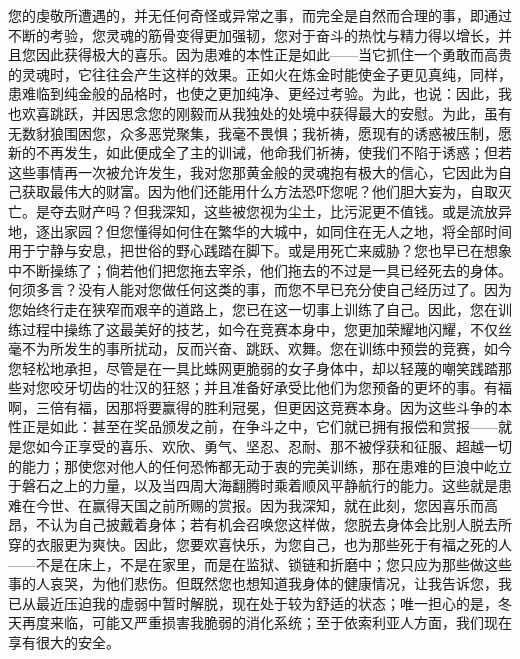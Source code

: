 您的虔敬所遭遇的，并无任何奇怪或异常之事，而完全是自然而合理的事，即通过不断的考验，您灵魂的筋骨变得更加强韧，您对于奋斗的热忱与精力得以增长，并且您因此获得极大的喜乐。因为患难的本性正是如此——当它抓住一个勇敢而高贵的灵魂时，它往往会产生这样的效果。正如火在炼金时能使金子更见真纯，同样，患难临到纯金般的品格时，也使之更加纯净、更经过考验。为此，也说：因此，我也欢喜跳跃，并因思念您的刚毅而从我独处的处境中获得最大的安慰。为此，虽有无数豺狼围困您，众多恶党聚集，我毫不畏惧；我祈祷，愿现有的诱惑被压制，愿新的不再发生，如此便成全了主的训诫，他命我们祈祷，使我们不陷于诱惑；但若这些事情再一次被允许发生，我对您那黄金般的灵魂抱有极大的信心，它因此为自己获取最伟大的财富。因为他们还能用什么方法恐吓您呢？他们胆大妄为，自取灭亡。是夺去财产吗？但我深知，这些被您视为尘土，比污泥更不值钱。或是流放异地，逐出家园？但您懂得如何住在繁华的大城中，如同住在无人之地，将全部时间用于宁静与安息，把世俗的野心践踏在脚下。或是用死亡来威胁？您也早已在想象中不断操练了；倘若他们把您拖去宰杀，他们拖去的不过是一具已经死去的身体。何须多言？没有人能对您做任何这类的事，而您不早已充分使自己经历过了。因为您始终行走在狭窄而艰辛的道路上，您已在这一切事上训练了自己。因此，您在训练过程中操练了这最美好的技艺，如今在竞赛本身中，您更加荣耀地闪耀，不仅丝毫不为所发生的事所扰动，反而兴奋、跳跃、欢舞。您在训练中预尝的竞赛，如今您轻松地承担，尽管是在一具比蛛网更脆弱的女子身体中，却以轻蔑的嘲笑践踏那些对您咬牙切齿的壮汉的狂怒；并且准备好承受比他们为您预备的更坏的事。有福啊，三倍有福，因那将要赢得的胜利冠冕，但更因这竞赛本身。因为这些斗争的本性正是如此：甚至在奖品颁发之前，在争斗之中，它们就已拥有报偿和赏报——就是您如今正享受的喜乐、欢欣、勇气、坚忍、忍耐、那不被俘获和征服、超越一切的能力；那使您对他人的任何恐怖都无动于衷的完美训练，那在患难的巨浪中屹立于磐石之上的力量，以及当四周大海翻腾时乘着顺风平静航行的能力。这些就是患难在今世、在赢得天国之前所赐的赏报。因为我深知，就在此刻，您因喜乐而高昂，不认为自己披戴着身体；若有机会召唤您这样做，您脱去身体会比别人脱去所穿的衣服更为爽快。因此，您要欢喜快乐，为您自己，也为那些死于有福之死的人——不是在床上，不是在家里，而是在监狱、锁链和折磨中；您只应为那些做这些事的人哀哭，为他们悲伤。但既然您也想知道我身体的健康情况，让我告诉您，我已从最近压迫我的虚弱中暂时解脱，现在处于较为舒适的状态；唯一担心的是，冬天再度来临，可能又严重损害我脆弱的消化系统；至于依索利亚人方面，我们现在享有很大的安全。\par

